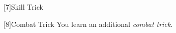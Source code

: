         [7]{Skill Trick} %

        [8]{Combat Trick}
        You learn an additional \textit{combat trick}.







\newpage
